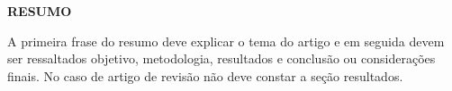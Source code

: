 \begin{center}
  \textbf{RESUMO}
\end{center}

\begin{singlespace}
  \noindent A primeira frase do resumo deve explicar o tema do artigo e em
  seguida devem ser ressaltados objetivo, metodologia, resultados e conclusão ou
  considerações finais. No caso de artigo de revisão não deve constar a seção
  resultados.
\end{singlespace}
